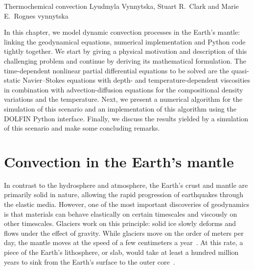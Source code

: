               {Thermochemical convection}
              {Lyudmyla Vynnytska,  Stuart R.~Clark and Marie E.~Rognes}
              {vynnytska}

\newcommand{\jump}[1]{[[#1]]}
\newcommand{\avg}[1]{\{#1\}}
\newcommand{\code}[1]{$\texttt{#1}$}

In this chapter, we model dynamic convection processes in the Earth's
mantle: linking the geodynamical equations, numerical implementation
and Python code tightly together. We start by giving a physical
motivation and description of this challenging problem and continue by
deriving its mathematical formulation. The time-dependent nonlinear
partial differential equations to be solved are the quasi-static
Navier--Stokes equations with depth- and temperature-dependent
viscosities in combination with advection-diffusion equations for the
compositional density variations and the temperature. Next, we present
a numerical algorithm for the simulation of this scenario and an
implementation of this algorithm using the DOLFIN Python
interface. Finally, we discuss the results yielded by a simulation of
this scenario and make some concluding remarks.


\section{Convection in the Earth's mantle}

In contrast to the hydrosphere and atmosphere, the Earth's crust and
mantle are primarily solid in nature, allowing the rapid progression
of earthquakes through the elastic media.  However, one of the most
important discoveries of geodynamics is that materials can behave
elastically on certain timescales and viscously on other
timescales. Glaciers work on this principle: solid ice slowly deforms
and flows under the effect of gravity.  While glaciers move on the
order of meters per day, the mantle moves at the speed of a few
centimeters a year~\citep{vanderMeer2010}.  At this rate, a piece of
the Earth's lithosphere, or slab, would take at least a hundred
million years to sink from the Earth's surface to the outer
core~\citep{Jarvis2007}.

